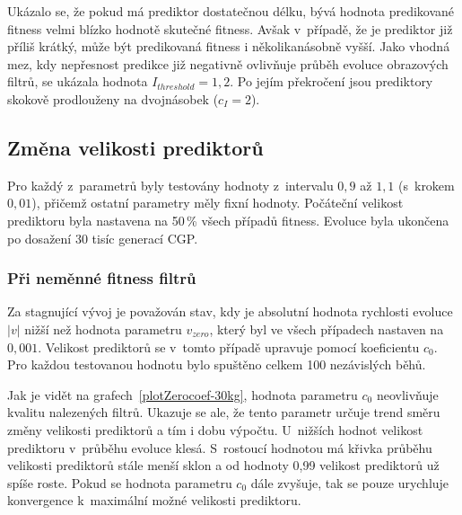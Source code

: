 Ukázalo se, že pokud má prediktor dostatečnou délku, bývá hodnota predikované fitness velmi blízko hodnotě skutečné fitness. Avšak v~případě, že je prediktor již příliš krátký, může být predikovaná fitness i několikanásobně vyšší. Jako vhodná mez, kdy nepřesnost predikce již negativně ovlivňuje průběh evoluce obrazových filtrů, se ukázala hodnota $I_\mathit{threshold} = 1,2$. Po jejím překročení jsou prediktory skokově prodlouženy na dvojnásobek ($c_I = 2$).

\subsection{Změna velikosti prediktorů}

Pro každý z~parametrů byly testovány hodnoty z~intervalu $0,9$ až $1,1$ (s~krokem $0,01$), přičemž ostatní parametry měly fixní hodnoty. Počáteční velikost prediktoru byla nastavena na 50\,\% všech případů fitness. Evoluce byla ukončena po dosažení 30 tisíc generací CGP.

\subsubsection*{Při neměnné fitness filtrů}

Za stagnující vývoj je považován stav, kdy je absolutní hodnota rychlosti evoluce $|v|$ nižší než hodnota parametru $v_\mathit{zero}$, který byl ve všech případech nastaven na $0,001$. Velikost prediktorů se v~tomto případě upravuje pomocí koeficientu $c_0$. Pro každou testovanou hodnotu bylo spuštěno celkem 100 nezávislých běhů.

Jak je vidět na grafech~\ref{plotZerocoef-30kg}, hodnota parametru $c_0$ neovlivňuje kvalitu nalezených filtrů. Ukazuje se ale, že tento parametr určuje trend směru změny velikosti prediktorů a tím i dobu výpočtu. U~nižších hodnot velikost prediktoru v~průběhu evoluce klesá. S~rostoucí hodnotou má křivka průběhu velikosti prediktorů stále menší sklon a od hodnoty 0,99 velikost prediktorů už spíše roste. Pokud se hodnota parametru $c_0$ dále zvyšuje, tak se pouze urychluje konvergence k~maximální možné velikosti prediktoru.

